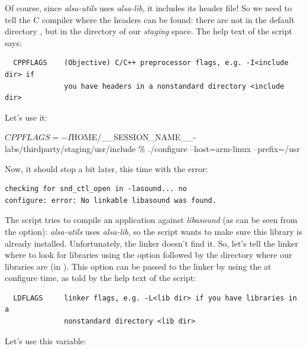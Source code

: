 Of course, since {\em alsa-utils} uses {\em alsa-lib}, it includes
its header file! So we need to tell the C compiler where the headers
can be found: there are not in the default directory
, but in the  directory of our
{\em staging} space. The help text of the  script says:

\begin{verbatim}
  CPPFLAGS    (Objective) C/C++ preprocessor flags, e.g. -I<include dir> if
              you have headers in a nonstandard directory <include dir>
\end{verbatim}

Let's use it:

\begin{bashinput}
$ CPPFLAGS=-I$HOME/__SESSION_NAME__-labs/thirdparty/staging/usr/include \%\linebreak
./configure --host=arm-linux --prefix=/usr
\end{bashinput}

Now, it should stop a bit later, this time with the error:
\begin{verbatim}
checking for snd_ctl_open in -lasound... no
configure: error: No linkable libasound was found.
\end{verbatim}

The  script tries to compile an application against {\em
  libasound} (as can be seen from the  option): {\em
  alsa-utils} uses {\em alsa-lib}, so the  script
wants to make sure this library is already installed. Unfortunately,
the  linker doesn't find it. So, let's tell the
linker where to look for libraries using the  option followed
by the directory where our libraries are (in
). This  option can be passed to the
linker by using the  at configure time, as told by the
help text of the  script:

\begin{verbatim}
  LDFLAGS     linker flags, e.g. -L<lib dir> if you have libraries in a
              nonstandard directory <lib dir>
\end{verbatim}

Let's use this  variable:



